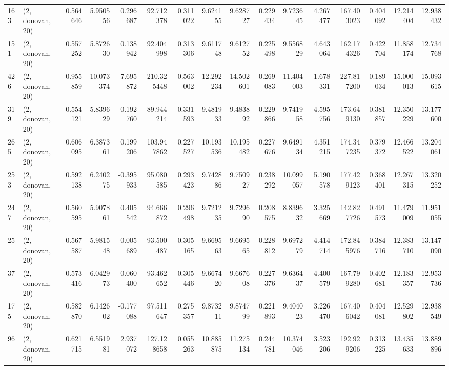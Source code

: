 \begin{tabular}{llrrrrrrrrrrrrrr}
163 &  (2, donovan, 20) &   0.564646 &   5.950556 &   0.296687 &    92.712378 &   0.311022 &   9.624155 &   9.628727 &  0.229434 &   9.723645 &   4.267477 &    167.403023 &   0.404092 &  12.214404 &   12.938432 \\
151 &  (2, donovan, 20) &   0.557252 &   5.872630 &   0.138942 &    92.404998 &   0.313306 &   9.611748 &   9.612752 &  0.225498 &   9.556829 &   4.643064 &    162.174326 &   0.422704 &  11.858174 &   12.734768 \\
426 &  (2, donovan, 20) &   0.955859 &  10.073374 &   7.695872 &   210.325448 &  -0.563002 &  12.292234 &  14.502601 &  0.269083 &  11.404003 &  -1.678331 &    227.817200 &   0.189034 &  15.000013 &   15.093615 \\
319 &  (2, donovan, 20) &   0.554121 &   5.839629 &   0.192760 &    89.944214 &   0.331593 &   9.481933 &   9.483892 &  0.229866 &   9.741958 &   4.595756 &    173.649130 &   0.381857 &  12.350229 &   13.177600 \\
265 &  (2, donovan, 20) &   0.606095 &   6.387361 &   0.199206 &   103.947862 &   0.227527 &  10.193536 &  10.195482 &  0.227676 &   9.649134 &   4.351215 &    174.347235 &   0.379372 &  12.466522 &   13.204061 \\
253 &  (2, donovan, 20) &   0.592138 &   6.240275 &  -0.395933 &    95.080585 &   0.293423 &   9.742886 &   9.750927 &  0.238292 &  10.099057 &   5.190578 &    177.429123 &   0.368401 &  12.267315 &   13.320252 \\
247 &  (2, donovan, 20) &   0.560595 &   5.907861 &   0.405542 &    94.666872 &   0.296498 &   9.721235 &   9.729690 &  0.208575 &   8.839632 &   3.325669 &    142.827726 &   0.491573 &  11.479009 &   11.951055 \\
25  &  (2, donovan, 20) &   0.567587 &   5.981548 &  -0.005689 &    93.500487 &   0.305165 &   9.669563 &   9.669565 &  0.228812 &   9.697279 &   4.414714 &    172.845976 &   0.384716 &  12.383710 &   13.147090 \\
37  &  (2, donovan, 20) &   0.573416 &   6.042973 &   0.060400 &    93.462652 &   0.305446 &   9.667420 &   9.667608 &  0.227376 &   9.636437 &   4.400579 &    167.799280 &   0.402681 &  12.183357 &   12.953736 \\
175 &  (2, donovan, 20) &   0.582870 &   6.142602 &  -0.177088 &    97.511647 &   0.275357 &   9.873211 &   9.874799 &  0.221893 &   9.404023 &   3.226470 &    167.406042 &   0.404081 &  12.529802 &   12.938549 \\
96  &  (2, donovan, 20) &   0.621715 &   6.551981 &   2.937072 &   127.128658 &   0.055263 &  10.885875 &  11.275134 &  0.244781 &  10.374046 &   3.523206 &    192.929206 &   0.313225 &  13.435633 &   13.889896 \\

\end{tabular}

